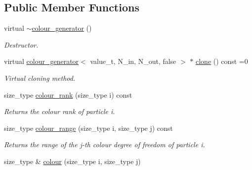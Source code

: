 \subsection*{Public Member Functions}
\begin{DoxyCompactItemize}
\item 
\hypertarget{a00078_a1044bee0f0a9c0fadf153f4c9581c8b9}{}virtual \hyperlink{a00078_a1044bee0f0a9c0fadf153f4c9581c8b9}{$\sim$colour\+\_\+generator} ()\label{a00078_a1044bee0f0a9c0fadf153f4c9581c8b9}

\begin{DoxyCompactList}\small\item\em Destructor. \end{DoxyCompactList}\item 
\hypertarget{a00078_af8ab8562a2d5f575ab2d78c8f5a147cc}{}virtual \hyperlink{a00077}{colour\+\_\+generator}$<$ value\+\_\+t, N\+\_\+in, N\+\_\+out, false $>$ $\ast$ \hyperlink{a00078_af8ab8562a2d5f575ab2d78c8f5a147cc}{clone} () const =0\label{a00078_af8ab8562a2d5f575ab2d78c8f5a147cc}

\begin{DoxyCompactList}\small\item\em Virtual cloning method. \end{DoxyCompactList}\item 
\hypertarget{a00078_ad98bfdc531f942c45685dc997d058022}{}size\+\_\+type \hyperlink{a00078_ad98bfdc531f942c45685dc997d058022}{colour\+\_\+rank} (size\+\_\+type i) const \label{a00078_ad98bfdc531f942c45685dc997d058022}

\begin{DoxyCompactList}\small\item\em Returns the colour rank of particle i. \end{DoxyCompactList}\item 
\hypertarget{a00078_ad7bd3090484c7046ebf5ae7d2abb60c8}{}size\+\_\+type \hyperlink{a00078_ad7bd3090484c7046ebf5ae7d2abb60c8}{colour\+\_\+range} (size\+\_\+type i, size\+\_\+type j) const \label{a00078_ad7bd3090484c7046ebf5ae7d2abb60c8}

\begin{DoxyCompactList}\small\item\em Returns the range of the j-\/th colour degree of freedom of particle i. \end{DoxyCompactList}\item 
\hypertarget{a00078_aa52bb677a682b0c054c576e261a0f19e}{}size\+\_\+type \& \hyperlink{a00078_aa52bb677a682b0c054c576e261a0f19e}{colour} (size\+\_\+type i, size\+\_\+type j)\label{a00078_aa52bb677a682b0c054c576e261a0f19e}


\end{DoxyCompactItemize}
